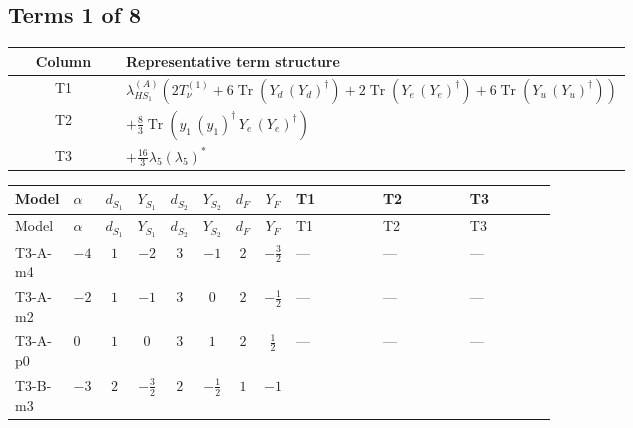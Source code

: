 \documentclass[8pt]{article}
\begin{document}
\begin{landscape}
\subsection*{Terms 1 of 8}
\begin{center}
\begin{tabular}{@{}c >{\raggedright\arraybackslash}p{0.82\linewidth}@{}}
\toprule
Column & Representative term structure \\
\midrule
T1 & \(\displaystyle {\lambda_{HS_1}^{(A)}} (2 T_{\nu}^{(1)}+6 \operatorname{Tr}\!\left({Y_d}\,\left({Y_d}\right)^{\dagger}\right)+2 \operatorname{Tr}\!\left({Y_e}\,\left({Y_e}\right)^{\dagger}\right)+6 \operatorname{Tr}\!\left({Y_u}\,\left({Y_u}\right)^{\dagger}\right))\) \\
\midrule
T2 & \(\displaystyle +\frac{8}{3} \operatorname{Tr}\!\left({y_1}\,\left({y_1}\right)^{\dagger}\,{Y_e}\,\left({Y_e}\right)^{\dagger}\right)\) \\
\midrule
T3 & \(\displaystyle +\frac{16}{3} {\lambda_5} \left({\lambda_5}\right)^{*}\) \\
\midrule
\bottomrule
\end{tabular}
\end{center}
\smallskip
\tiny
\begin{longtable}{@{}llcccccc >{\raggedright\arraybackslash}p{0.21\linewidth} >{\raggedright\arraybackslash}p{0.21\linewidth} >{\raggedright\arraybackslash}p{0.21\linewidth}@{}}
\toprule
Model & $\alpha$ & $d_{S_1}$ & $Y_{S_1}$ & $d_{S_2}$ & $Y_{S_2}$ & $d_F$ & $Y_F$ & T1 & T2 & T3 \\
\midrule
\endfirsthead
\toprule
Model & $\alpha$ & $d_{S_1}$ & $Y_{S_1}$ & $d_{S_2}$ & $Y_{S_2}$ & $d_F$ & $Y_F$ & T1 & T2 & T3 \\
\midrule
\endhead
T3-A-m4 & $-4$ & $1$ & $-2$ & $3$ & $-1$ & $2$ & $-\frac{3}{2}$ & --- & --- & --- \\
\midrule
T3-A-m2 & $-2$ & $1$ & $-1$ & $3$ & $0$ & $2$ & $-\frac{1}{2}$ & --- & --- & --- \\
\midrule
T3-A-p0 & $0$ & $1$ & $0$ & $3$ & $1$ & $2$ & $\frac{1}{2}$ & --- & --- & --- \\
\midrule
T3-B-m3 & $-3$ & $2$ & $-\frac{3}{2}$ & $2$ & $-\frac{1}{2}$ & $1$ & $-1$ & \scriptsize\adjustbox{max width=\linewidth}{$\begin{gathered} {\lambda_{HS_1}^{(A)}} (2 T_{\nu}^{(1)}+6 \operatorname{Tr}\!\left({Y_d}\,\left({Y_d}\right)^{\dagger}\right)+2 \operatorname{Tr}\!\left({Y_e}\,\left({Y_e}\right)^{\dagger}\right)+6 \operatorname{Tr}\!\left({Y_u}\,\left({Y_u}\right)^{\dagger}\right))\end{gathered}$} & \scriptsize\adjustbox{max width=\linewidth}{$\begin{gathered} +\frac{8}{3} \operatorname{Tr}\!\left({y_1}\,\left({y_1}\right)^{\dagger}\,{Y_e}\,\left({Y_e}\right)^{\dagger}\right)\end{gathered}$} & \scriptsize\adjustbox{max width=\linewidth}{$\begin{gathered} +\frac{16}{3} {\lambda_5} \left({\lambda_5}\right)^{*}\end{gathered}$} \\

\end{longtable}
\end{landscape}
\end{document}
